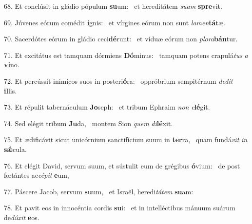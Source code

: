 68. Et conclúsit in gládio pópulum \textbf{su}um: \ast\  et hereditátem \textit{su}\textit{am} \textbf{spre}vit.\

69. Júvenes eórum comédit \textbf{i}gnis: \ast\  et vírgines eórum non sunt \textit{la}\textit{men}\textbf{tá}tæ.\

70. Sacerdótes eórum in gládio ceci\textbf{dé}runt: \ast\  et víduæ eórum non \textit{plo}\textit{ra}\textbf{bán}tur.\

71. Et excitátus est tamquam dórmiens \textbf{Dó}minus: \ast\  tamquam potens crapulá\textit{tus} \textit{a} \textbf{vi}no.\

72. Et percússit inimícos suos in posteri\textbf{ó}ra: \ast\  oppróbrium sempitérnum \textit{de}\textit{dit} \textbf{il}lis.\

73. Et répulit tabernáculum \textbf{Jo}seph: \ast\  et tribum Ephraim \textit{non} \textit{e}\textbf{lé}git.\

74. Sed elégit tribum \textbf{Ju}da, \ast\  montem Sion \textit{quem} \textit{di}\textbf{lé}xit.\

75. Et ædificávit sicut unicórnium sanctifícium suum in \textbf{ter}ra, \ast\  quam fundá\textit{vit} \textit{in} \textbf{sǽ}cula.\

76. Et elégit David, servum suum, et sústulit eum de grégibus \textbf{ó}vium: \ast\  de post fœtántes ac\textit{cé}\textit{pit} \textbf{e}um,\

77. Páscere Jacob, servum \textbf{su}um, \ast\  et Israël, heredi\textit{tá}\textit{tem} \textbf{su}am:\

78. Et pavit eos in innocéntia cordis \textbf{su}i: \ast\  et in intelléctibus mánuum suárum de\textit{dú}\textit{xit} \textbf{e}os.\

